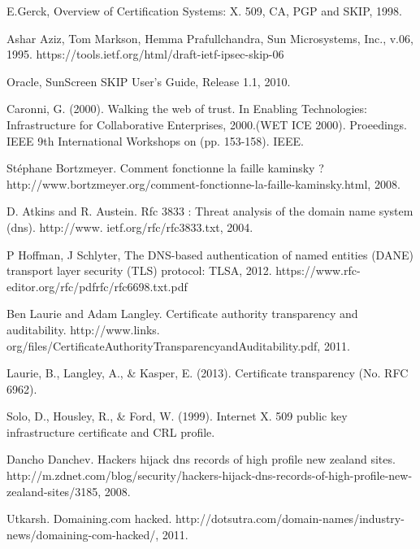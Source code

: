 \documentclass[journal, a4paper]{IEEEtran}
\begin{document}
\begin{thebibliography}{99}

 E.Gerck, Overview of Certification Systems: X. 509, CA, PGP and SKIP, 1998.

 Ashar Aziz, Tom Markson, Hemma Prafullchandra, Sun Microsystems, Inc., v.06, 1995. https://tools.ietf.org/html/draft-ietf-ipsec-skip-06

 Oracle, SunScreen SKIP User's Guide, Release 1.1, 2010. %

 Caronni, G. (2000). Walking the web of trust. In Enabling Technologies: Infrastructure for Collaborative Enterprises, 2000.(WET ICE 2000). Proeedings. IEEE 9th International Workshops on (pp. 153-158). IEEE. %

 Stéphane Bortzmeyer. Comment fonctionne la faille kaminsky ? http://www.bortzmeyer.org/comment-fonctionne-la-faille-kaminsky.html, 2008.

 D. Atkins and R. Austein. Rfc 3833 : Threat analysis of the domain name system (dns). http://www.
ietf.org/rfc/rfc3833.txt, 2004.

 P Hoffman, J Schlyter, The DNS-based authentication of named entities (DANE) transport layer security (TLS) protocol: TLSA, 2012. https://www.rfc-editor.org/rfc/pdfrfc/rfc6698.txt.pdf

 Ben Laurie and Adam Langley. Certificate authority transparency and auditability. http://www.links.
org/files/CertificateAuthorityTransparencyandAuditability.pdf, 2011.

 Laurie, B., Langley, A., \& Kasper, E. (2013). Certificate transparency (No. RFC 6962). %

 Solo, D., Housley, R., \& Ford, W. (1999). Internet X. 509 public key infrastructure certificate and CRL profile. %

 Dancho Danchev. Hackers hijack dns records of high profile new zealand sites. http://m.zdnet.com/blog/security/hackers-hijack-dns-records-of-high-profile-new-zealand-sites/3185, 2008.

 Utkarsh. Domaining.com hacked. http://dotsutra.com/domain-names/industry-news/domaining-com-hacked/, 2011.


\end{thebibliography}
\end{document}
